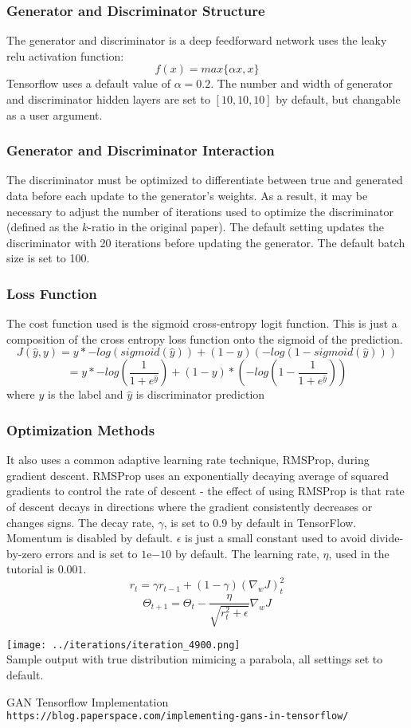 \documentclass[12pt]{article}
\begin{document}
\subsubsection*{Generator and Discriminator Structure}
The generator and discriminator is a deep feedforward network uses the leaky relu activation function:
$$ f(x)=max\{\alpha x, x\} $$
Tensorflow uses a default value of $\alpha=0.2$. The number and width of generator and discriminator hidden layers are set to $[10,10,10]$ by default, but changable as a user argument.

\subsubsection*{Generator and Discriminator Interaction}
The discriminator must be optimized to differentiate between true and generated data before each update to the generator's weights. As a result, it may be necessary to adjust the number of iterations used to optimize the discriminator (defined as the $k$-ratio in the original paper). The default setting updates the discriminator with 20 iterations before updating the generator. The default batch size is set to 100.

\subsubsection*{Loss Function}
The cost function used is the sigmoid cross-entropy logit function. This is just a composition of the cross entropy loss function onto the sigmoid of the prediction.
$$J(\hat{y},y)=y*-log(sigmoid(\hat{y}))+(1-y)(-log(1-sigmoid(\hat{y})))$$
$$=y*-log(\frac{1}{1+e^{\hat{y}}})+(1-y)*(-log(1-\frac{1}{1+e^{\hat{y}}}))$$
where $y$ is the label and $\hat{y}$ is discriminator prediction

\subsubsection*{Optimization Methods}
It also uses a common adaptive learning rate technique, RMSProp, during gradient descent. RMSProp uses an exponentially decaying average of squared gradients to control the rate of descent - the effect of using RMSProp is that rate of descent decays in directions where the gradient consistently decreases or changes signs. The decay rate, $\gamma$, is set to 0.9 by default in TensorFlow. Momentum is disabled by default. $\epsilon$ is just a small constant used to avoid divide-by-zero errors and is set to $1\mathrm{e}{-10}$ by default. The learning rate, $\eta$, used in the tutorial is $0.001$.
$$r_t=\gamma r_{t-1}+(1-\gamma)(\nabla_w J)^2_t$$
$$\Theta_{t+1}=\Theta_{t}-\frac{\eta}{\sqrt{r^2_t+\epsilon}}\nabla_w J$$

\texttt{[image: ../iterations/iteration\_4900.png]}\\
Sample output with true distribution mimicing a parabola, all settings set to default.

\begin{thebibliography}{9}
GAN Tensorflow Implementation
\\\texttt{https://blog.paperspace.com/implementing-gans-in-tensorflow/}
\end{thebibliography}
\end{document}
